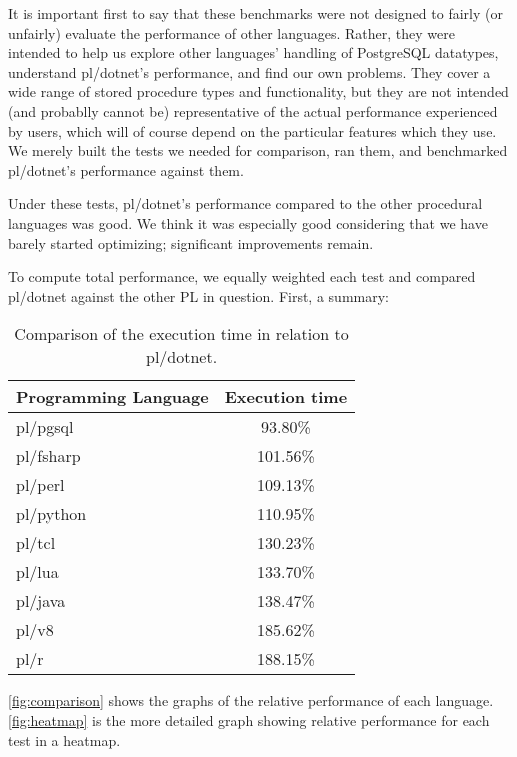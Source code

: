 \documentclass[sigconf,techreport,authorversion,nonacm]{acmart}
\begin{document}
It is important first to say that these benchmarks were not designed
to fairly (or unfairly) evaluate the performance of other languages.
Rather, they were intended to help us explore other languages'
handling of PostgreSQL datatypes, understand pl/dotnet's performance,
and find our own problems. They cover a wide range of stored
procedure types and functionality, but they are not intended (and
probablly cannot be) representative of the actual performance
experienced by users, which will of course depend on the particular
features which they use. We merely built the tests we needed for
comparison, ran them, and benchmarked pl/dotnet's performance against
them.

Under these tests, pl/dotnet's performance compared to the other
procedural languages was good. We think it was especially good
considering that we have barely started optimizing; significant
improvements remain.

To compute total performance, we equally weighted each test and
compared pl/dotnet against the other PL in question. First, a
summary:


\begin{table}[!htbp]
       \caption{Comparison of the execution time in relation to pl/dotnet.}
       \begin{tabular}{l | c }
               \toprule
               \rowcolor{gray!25} \textbf{Programming Language} & \textbf{Execution time} \\ \midrule
                pl/pgsql             &   93.80\%    \\
                pl/fsharp            &  101.56\%    \\
                pl/perl              &  109.13\%    \\
                pl/python            &  110.95\%    \\
                pl/tcl               &  130.23\%    \\
                pl/lua               &  133.70\%    \\
                pl/java              &  138.47\%    \\
                pl/v8                &  185.62\%    \\
                pl/r                 &  188.15\%    \\ \bottomrule
       \end{tabular}
\end{table}

\autoref{fig:comparison} shows the graphs of the relative performance
of each language.  \autoref{fig:heatmap} is the more detailed graph
showing relative performance for each test in a heatmap.
\end{document}
